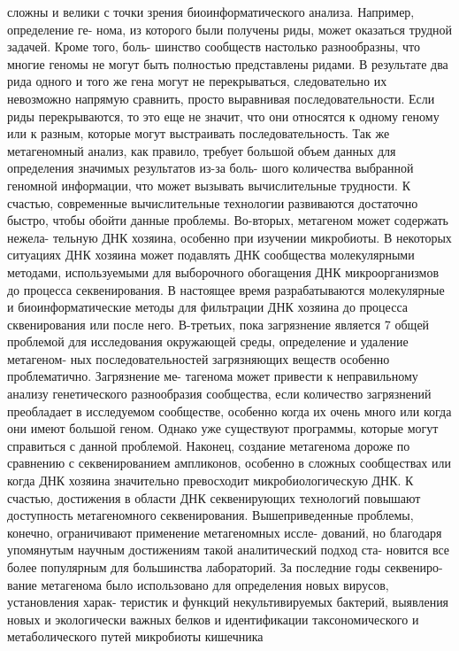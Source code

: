 сложны и велики с точки зрения биоинформатического анализа. Например, определение ге-
нома, из которого были получены риды, может оказаться трудной задачей. Кроме того, боль-
шинство сообществ настолько разнообразны, что многие геномы не могут быть полностью
представлены ридами. В результате два рида одного и того же гена могут не перекрываться,
следовательно их невозможно напрямую сравнить, просто выравнивая последовательности.
Если риды перекрываются, то это еще не значит, что они относятся к одному геному или к
разным, которые могут выстраивать последовательность. Так же метагеномный анализ, как
правило, требует большой объем данных для определения значимых результатов из-за боль-
шого количества выбранной геномной информации, что может вызывать вычислительные
трудности. К счастью, современные вычислительные технологии развиваются достаточно
быстро, чтобы обойти данные проблемы. Во-вторых, метагеном может содержать нежела-
тельную ДНК хозяина, особенно при изучении микробиоты. В некоторых ситуациях ДНК
хозяина может подавлять ДНК сообщества молекулярными методами, используемыми для
выборочного обогащения ДНК микроорганизмов до процесса секвенирования. В настоящее
время разрабатываются молекулярные и биоинформатические методы для фильтрации ДНК
хозяина до процесса сквенирования или после него. В-третьих, пока загрязнение является
7
общей проблемой для исследования окружающей среды, определение и удаление метагеном-
ных последовательностей загрязняющих веществ особенно проблематично. Загрязнение ме-
тагенома может привести к неправильному анализу генетического разнообразия сообщества,
если количество загрязнений преобладает в исследуемом сообществе, особенно когда их очень
много или когда они имеют большой геном. Однако уже существуют программы, которые
могут справиться с данной проблемой. Наконец, создание метагенома дороже по сравнению
с секвенированием ампликонов, особенно в сложных сообществах или когда ДНК хозяина
значительно превосходит микробиологическую ДНК. К счастью, достижения в области ДНК
секвенирующих технологий повышают доступность метагеномного секвенирования.
Вышеприведенные проблемы, конечно, ограничивают применение метагеномных иссле-
дований, но благодаря упомянутым научным достижениям такой аналитический подход ста-
новится все более популярным для большинства лабораторий. За последние годы секвениро-
вание метагенома было использовано для определения новых вирусов, установления харак-
теристик и функций некультивируемых бактерий, выявления новых и экологически важных
белков и идентификации таксономического и метаболического путей микробиоты кишечника
